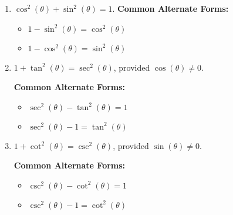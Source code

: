 \documentclass{ximera}
\begin{document}
\begin{callout}
  \begin{enumerate}
    \item $\cos^{2}(\theta) + \sin^{2}(\theta) = 1$.
    \textbf{Common Alternate Forms:}

\begin{itemize}

\item  $1 - \sin^{2}(\theta) = \cos^{2}(\theta)$

\item  $1 - \cos^{2}(\theta) = \sin^{2}(\theta)$

\end{itemize}

\item $1 + \tan^{2}(\theta) = \sec^{2}(\theta)$, provided $\cos(\theta) \neq 0$.

\textbf{Common Alternate Forms:}

\begin{itemize}

\item  $\sec^{2}(\theta) - \tan^{2}(\theta) = 1$

\item  $\sec^{2}(\theta) - 1 = \tan^{2}(\theta)$

\end{itemize}

\item $1 + \cot^{2}(\theta) = \csc^{2}(\theta)$, provided $\sin(\theta) \neq 0$.

\textbf{Common Alternate Forms:}

\begin{itemize}

\item  $\csc^{2}(\theta) - \cot^{2}(\theta) = 1$

\item  $\csc^{2}(\theta) - 1 = \cot^{2}(\theta)$

\end{itemize}

\end{enumerate}
\end{callout}
\end{document}
